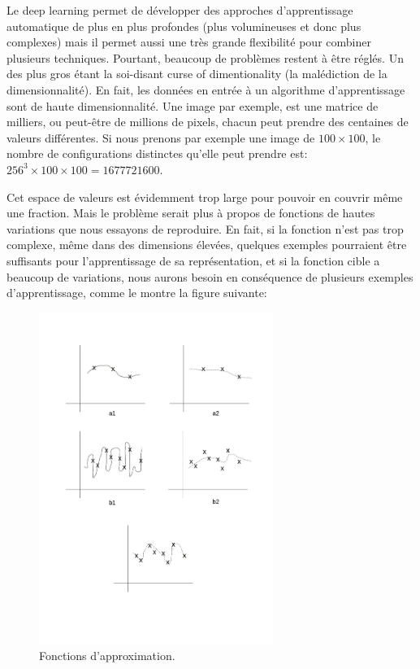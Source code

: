 Le deep learning permet de développer des approches d'apprentissage automatique de plus en plus profondes (plus volumineuses et donc plus complexes) mais il permet aussi une très grande flexibilité pour combiner plusieurs techniques. Pourtant, beaucoup de problèmes restent à être réglés. Un des plus gros étant la soi-disant curse of dimentionality (la malédiction de la dimensionnalité). En fait, les données en entrée à un algorithme d'apprentissage sont de haute dimensionnalité. Une image par exemple, est une matrice de milliers, ou peut-être de millions de pixels, chacun peut prendre des centaines de valeurs différentes. Si nous prenons par exemple une image de $100 \times 100$, le nombre de configurations distinctes qu'elle peut prendre est:
$256^{3} \times 100 \times 100 = 1 677 721 600$.

Cet espace de valeurs est évidemment trop large pour pouvoir en couvrir même une fraction. Mais le problème serait plus à propos de fonctions de hautes variations que nous essayons de reproduire. En fait, si la fonction n'est pas trop complexe, même dans des dimensions élevées, quelques exemples pourraient être suffisants pour l'apprentissage de sa représentation, et si la fonction cible a beaucoup de variations, nous aurons besoin en conséquence de plusieurs exemples d'apprentissage, comme le montre la figure suivante:

\begin{figure}[H]
	\centering
		\includegraphics[width=3in]{Figures/highVariation.jpg}
	\caption[FA]{Fonctions d'approximation.}
	\label{fig:Electron}
\end{figure}


